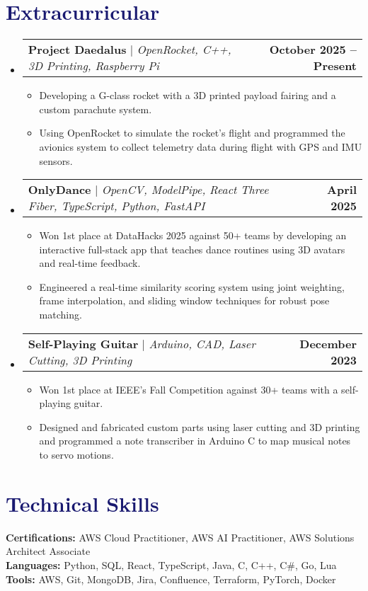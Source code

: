 \documentclass[letterpaper,11pt]{article}
\makeatletter
\newcommand{\resumeItem}[1]{
  \item\small{
    {#1 \vspace{-2pt}}
  }
}
\newcommand{\resumeProjectHeading}[2]{
    \item
    \begin{tabular*}{1.001\textwidth}{l@{\extracolsep{\fill}}r}
      \small#1 & \textbf{\small #2}\\
    \end{tabular*}\vspace{-7pt}
}
\newcommand{\resumeSubHeadingListStart}{\begin{itemize}[leftmargin=0.0in, label={}]}
\newcommand{\resumeSubHeadingListEnd}{\end{itemize}}
\newcommand{\resumeItemListStart}{\begin{itemize}}
\newcommand{\resumeItemListEnd}{\end{itemize}\vspace{-5pt}}
\newcommand\accentColor{MidnightBlue}
\makeatother
\begin{document}
\section{\textcolor{\accentColor}{Extracurricular}}
    \vspace{-7pt}
    \resumeSubHeadingListStart
    \resumeProjectHeading
        {\textbf{Project Daedalus} $|$ \emph{OpenRocket, C++, 3D Printing, Raspberry Pi}}{October 2025 -- Present}
        \resumeItemListStart
            \resumeItem{Developing a G-class rocket with a 3D printed payload fairing and a custom parachute system.}
            \resumeItem{Using OpenRocket to simulate the rocket's flight and programmed the avionics system to collect telemetry data during flight with GPS and IMU sensors.}
        \resumeItemListEnd
    \vspace{-15pt}

    \resumeProjectHeading
        {\textbf{OnlyDance} $|$ \emph{OpenCV, ModelPipe, React Three Fiber, TypeScript, Python, FastAPI}}{April 2025}
        \resumeItemListStart
            \resumeItem{Won 1st place at DataHacks 2025 against 50+ teams by developing an interactive full-stack app that teaches dance routines using 3D avatars and real-time feedback.}
            \resumeItem{Engineered a real-time similarity scoring system using joint weighting, frame interpolation, and sliding window techniques for robust pose matching.}
        \resumeItemListEnd
        \vspace{-15pt}

    \resumeProjectHeading
        {\textbf{Self-Playing Guitar} $|$ \emph{Arduino, CAD, Laser Cutting, 3D Printing}}{December 2023}
        \resumeItemListStart
            \resumeItem{Won 1st place at IEEE's Fall Competition against 30+ teams with a self-playing guitar.}
            \resumeItem{Designed and fabricated custom parts using laser cutting and 3D printing and programmed a note transcriber in Arduino C to map musical notes to servo motions.}
        \resumeItemListEnd
    \resumeSubHeadingListEnd
\vspace{-15pt}
    
\section{\textcolor{\accentColor}{Technical Skills}}
 \begin{itemize}[leftmargin=0.15in, label={}]
    \small{\item{
    \textbf{Certifications: }{AWS Cloud Practitioner, AWS AI Practitioner, AWS Solutions Architect Associate} \\
    \textbf{Languages: }{Python, SQL, React, TypeScript, Java, C, C++, C\#, Go, Lua} \\
    \textbf{Tools: }{AWS, Git, MongoDB, Jira, Confluence, Terraform, PyTorch, Docker}
    }}
 \end{itemize}
 \vspace{-8pt}
\end{document}
